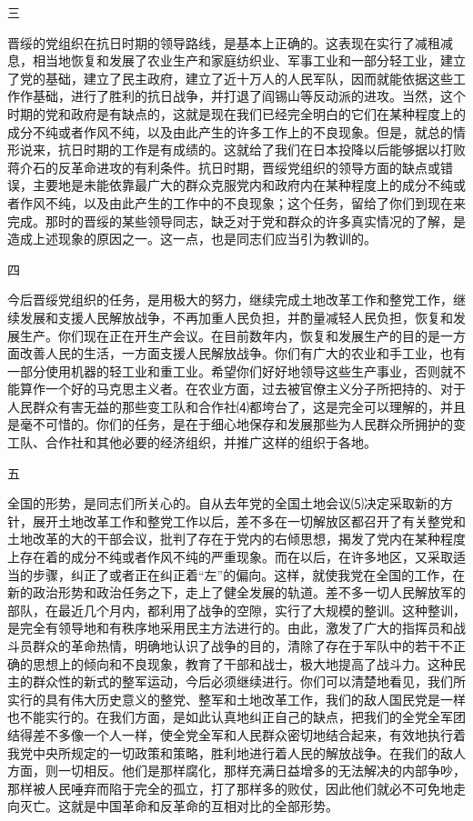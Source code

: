 \documentclass[UTF-8, a5paper, 12pt]{ctexart}
\begin{document}
三

晋绥的党组织在抗日时期的领导路线，是基本上正确的。这表现在实行了减租减息，相当地恢复和发展了农业生产和家庭纺织业、军事工业和一部分轻工业，建立了党的基础，建立了民主政府，建立了近十万人的人民军队，因而就能依据这些工作作基础，进行了胜利的抗日战争，并打退了阎锡山等反动派的进攻。当然，这个时期的党和政府是有缺点的，这就是现在我们已经完全明白的它们在某种程度上的成分不纯或者作风不纯，以及由此产生的许多工作上的不良现象。但是，就总的情形说来，抗日时期的工作是有成绩的。这就给了我们在日本投降以后能够据以打败蒋介石的反革命进攻的有利条件。抗日时期，晋绥党组织的领导方面的缺点或错误，主要地是未能依靠最广大的群众克服党内和政府内在某种程度上的成分不纯或者作风不纯，以及由此产生的工作中的不良现象；这个任务，留给了你们到现在来完成。那时的晋绥的某些领导同志，缺乏对于党和群众的许多真实情况的了解，是造成上述现象的原因之一。这一点，也是同志们应当引为教训的。

四

今后晋绥党组织的任务，是用极大的努力，继续完成土地改革工作和整党工作，继续发展和支援人民解放战争，不再加重人民负担，并酌量减轻人民负担，恢复和发展生产。你们现在正在开生产会议。在目前数年内，恢复和发展生产的目的是一方面改善人民的生活，一方面支援人民解放战争。你们有广大的农业和手工业，也有一部分使用机器的轻工业和重工业。希望你们好好地领导这些生产事业，否则就不能算作一个好的马克思主义者。在农业方面，过去被官僚主义分子所把持的、对于人民群众有害无益的那些变工队和合作社⑷都垮台了，这是完全可以理解的，并且是毫不可惜的。你们的任务，是在于细心地保存和发展那些为人民群众所拥护的变工队、合作社和其他必要的经济组织，并推广这样的组织于各地。

五

全国的形势，是同志们所关心的。自从去年党的全国土地会议⑸决定采取新的方针，展开土地改革工作和整党工作以后，差不多在一切解放区都召开了有关整党和土地改革的大的干部会议，批判了存在于党内的右倾思想，揭发了党内在某种程度上存在着的成分不纯或者作风不纯的严重现象。而在以后，在许多地区，又采取适当的步骤，纠正了或者正在纠正着“左”的偏向。这样，就使我党在全国的工作，在新的政治形势和政治任务之下，走上了健全发展的轨道。差不多一切人民解放军的部队，在最近几个月内，都利用了战争的空隙，实行了大规模的整训。这种整训，是完全有领导地和有秩序地采用民主方法进行的。由此，激发了广大的指挥员和战斗员群众的革命热情，明确地认识了战争的目的，清除了存在于军队中的若干不正确的思想上的倾向和不良现象，教育了干部和战士，极大地提高了战斗力。这种民主的群众性的新式的整军运动，今后必须继续进行。你们可以清楚地看见，我们所实行的具有伟大历史意义的整党、整军和土地改革工作，我们的敌人国民党是一样也不能实行的。在我们方面，是如此认真地纠正自己的缺点，把我们的全党全军团结得差不多像一个人一样，使全党全军和人民群众密切地结合起来，有效地执行着我党中央所规定的一切政策和策略，胜利地进行着人民的解放战争。在我们的敌人方面，则一切相反。他们是那样腐化，那样充满日益增多的无法解决的内部争吵，那样被人民唾弃而陷于完全的孤立，打了那样多的败仗，因此他们就必不可免地走向灭亡。这就是中国革命和反革命的互相对比的全部形势。
\end{document}

